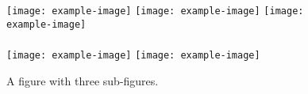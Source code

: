 \begin{figure}[thbp]
    \centering
    \texttt{[image: example-image]}
    \texttt{[image: example-image]}
    \texttt{[image: example-image]}
    \\
    \\ \vspace{0.5em}
    \texttt{[image: example-image]}
    \texttt{[image: example-image]}
     \\
    \caption{A figure with three sub-figures.}
    \label{fig:fig15}
\end{figure}
